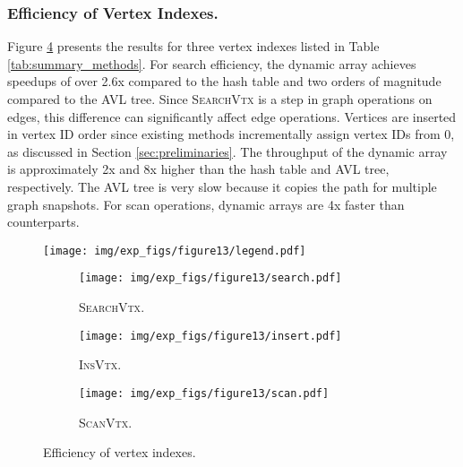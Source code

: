
\subsubsection{Efficiency of Vertex Indexes.} Figure \ref{fig:vertex_index_performances} presents the results for three vertex indexes listed in Table \ref{tab:summary_methods}. For search efficiency, the dynamic array achieves speedups of over 2.6x compared to the hash table and two orders of magnitude compared to the AVL tree. Since \textsc{SearchVtx} is a step in graph operations on edges, this difference can significantly affect edge operations. Vertices are inserted in vertex ID order since existing methods incrementally assign vertex IDs from 0, as discussed in Section \ref{sec:preliminaries}. The throughput of the dynamic array is approximately 2x and 8x higher than the hash table and AVL tree, respectively. The AVL tree is very slow because it copies the path for multiple graph snapshots. For scan operations, dynamic arrays are 4x faster than counterparts.



\begin{figure}[h]
	\setlength{\abovecaptionskip}{0pt}
	\setlength{\belowcaptionskip}{0pt}
		\captionsetup[subfigure]{aboveskip=0pt,belowskip=0pt}
	\centering
    \texttt{[image: img/exp\_figs/figure13/legend.pdf]}
    
    \begin{subfigure}[t]{0.20\textwidth}
    		\centering
    		\texttt{[image: img/exp\_figs/figure13/search.pdf]}
    		\caption{\textsc{SearchVtx}.}
    		\label{fig:vertex_search_performance}
    \end{subfigure}  
    \begin{subfigure}[t]{0.20\textwidth}
    		\centering
    		\texttt{[image: img/exp\_figs/figure13/insert.pdf]}
    		\caption{\textsc{InsVtx}.}
    		\label{fig:vertex_insert_performance}
    \end{subfigure}
    \begin{subfigure}[t]{0.20\textwidth}
    		\centering
    		\texttt{[image: img/exp\_figs/figure13/scan.pdf]}
    		\caption{\textsc{ScanVtx}.}
    		\label{fig:vertex_scan_performance}
    \end{subfigure}     
    \caption{Efficiency of vertex indexes.}
    \label{fig:vertex_index_performances}
\end{figure}


